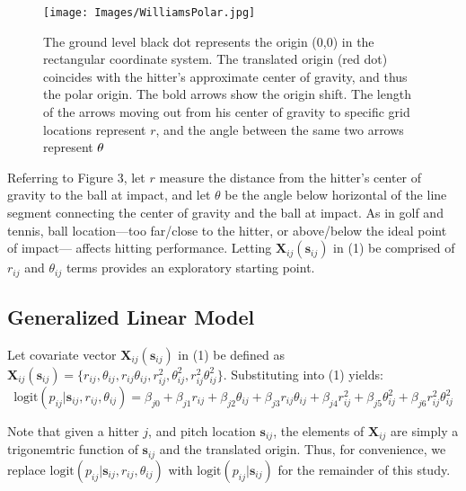 
  \begin{figure}[H]
	\centering
	\texttt{[image: Images/WilliamsPolar.jpg]}
	\caption{The ground level black dot represents the origin (0,0) in the rectangular coordinate system. The translated origin (red dot) coincides with the hitter's approximate center of gravity, and thus the polar origin. The bold arrows show the origin shift. The length of the arrows moving out from his center of gravity to specific grid locations represent $r$, and the angle between the same two arrows represent $\protect\theta$}
	\end{figure}
Referring to Figure 3, let $r$ measure the distance from the hitter's center of gravity to the ball at impact, and let $\theta$ be the angle below horizontal of the line segment connecting the center of gravity and the ball at impact. As in golf and tennis, ball location---too far/close to the hitter, or above/below the ideal point of impact--- affects hitting performance. Letting $\pmb{X}_{ij}(\pmb{s}_{ij})$ in (1) be comprised of $r_{ij}$ and $\theta_{ij}$ terms provides an exploratory starting point.

\subsection{Generalized Linear Model} %

Let covariate vector $\pmb{X}_{ij}(\pmb{s}_{ij})$ in (1) be defined as $\pmb{X}_{ij}(\pmb{s}_{ij}) = \{r_{ij}, \theta_{ij}, r_{ij}\theta_{ij}, r_{ij}^{2}, \theta_{ij}^{2}, r_{ij}^{2}\theta_{ij}^{2}\}$. Substituting into (1) yields:
\begin{equation}
\text{logit}(p_{ij}|\pmb{s}_{ij}, r_{ij}, \theta_{ij}) = \beta_{j0} + \beta_{j1}r_{ij} + \beta_{j2} \theta_{ij} + \beta_{j3} r_{ij} \theta_{ij} + \beta_{j4}r_{ij}^{2} + \beta_{j5} \theta_{ij}^{2} + \beta_{j6} r_{ij}^{2} \theta_{ij}^{2}
\end{equation}

Note that given a hitter $j$, and pitch location $\pmb{s}_{ij}$, the elements of $\pmb{X}_{ij}$ are simply a trigonemtric function of $\pmb{s}_{ij}$ and the translated origin. Thus, for convenience, we replace $\text{logit}(p_{ij}|\pmb{s}_{ij}, r_{ij}, \theta_{ij})$ with $\text{logit}(p_{ij}|\pmb{s}_{ij})$ for the remainder of this study.


